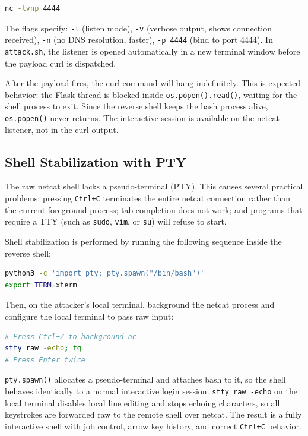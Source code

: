 \begin{lstlisting}[language=bash]
nc -lvnp 4444
\end{lstlisting}

The flags specify: \texttt{-l} (listen mode), \texttt{-v} (verbose output, shows connection received), \texttt{-n} (no DNS resolution, faster), \texttt{-p 4444} (bind to port 4444). In \texttt{attack.sh}, the listener is opened automatically in a new terminal window before the payload curl is dispatched.

After the payload fires, the curl command will hang indefinitely. This is expected behavior: the Flask thread is blocked inside \texttt{os.popen().read()}, waiting for the shell process to exit. Since the reverse shell keeps the bash process alive, \texttt{os.popen()} never returns. The interactive session is available on the netcat listener, not in the curl output.

\subsection{Shell Stabilization with PTY}

The raw netcat shell lacks a pseudo-terminal (PTY). This causes several practical problems: pressing \texttt{Ctrl+C} terminates the entire netcat connection rather than the current foreground process; tab completion does not work; and programs that require a TTY (such as \texttt{sudo}, \texttt{vim}, or \texttt{su}) will refuse to start.

Shell stabilization is performed by running the following sequence inside the reverse shell:

\begin{lstlisting}[language=bash]
python3 -c 'import pty; pty.spawn("/bin/bash")'
export TERM=xterm
\end{lstlisting}

Then, on the attacker's local terminal, background the netcat process and configure the local terminal to pass raw input:

\begin{lstlisting}[language=bash]
# Press Ctrl+Z to background nc
stty raw -echo; fg
# Press Enter twice
\end{lstlisting}

\texttt{pty.spawn()} allocates a pseudo-terminal and attaches bash to it, so the shell behaves identically to a normal interactive login session. \texttt{stty raw -echo} on the local terminal disables local line editing and stops echoing characters, so all keystrokes are forwarded raw to the remote shell over netcat. The result is a fully interactive shell with job control, arrow key history, and correct \texttt{Ctrl+C} behavior.

